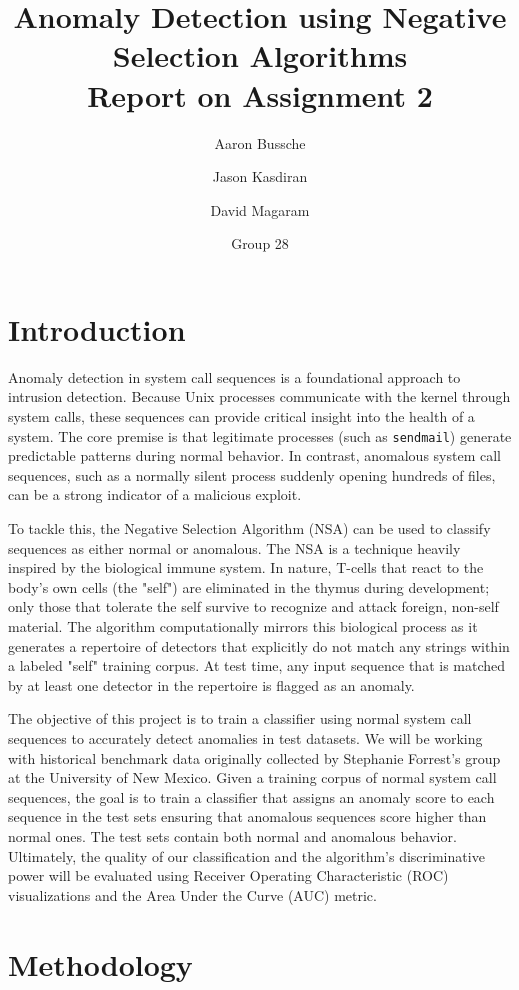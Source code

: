 \documentclass{article}
\title{Anomaly Detection using Negative Selection Algorithms\\[0.3em] \large Report on Assignment 2}
\author{Aaron Bussche \and Jason Kasdiran \and David Magaram}
\date{Group 28}
\begin{document}
\maketitle

\section{Introduction}
Anomaly detection in system call sequences is a foundational approach to intrusion detection. Because Unix processes communicate with the kernel through system calls, these sequences can provide critical insight into the health of a system. The core premise is that legitimate processes (such as \texttt{sendmail}) generate predictable patterns during normal behavior. In contrast, anomalous system call sequences, such as a normally silent process suddenly opening hundreds of files, can be a strong indicator of a malicious exploit.

To tackle this, the Negative Selection Algorithm (NSA) can be used to classify sequences as either normal or anomalous. The NSA is a technique heavily inspired by the biological immune system. In nature, T-cells that react to the body’s own cells (the "self") are eliminated in the thymus during development; only those that tolerate the self survive to recognize and attack foreign, non-self material. The algorithm computationally mirrors this biological process as it generates a repertoire of detectors that explicitly do not match any strings within a labeled "self" training corpus. At test time, any input sequence that is matched by at least one detector in the repertoire is flagged as an anomaly.

The objective of this project is to train a classifier using normal system call sequences to accurately detect anomalies in test datasets. We will be working with historical benchmark data originally collected by Stephanie Forrest's group at the University of New Mexico. Given a training corpus of normal system call sequences, the goal is to train a classifier that assigns an anomaly score to each sequence in the test sets ensuring that anomalous sequences score higher than normal ones. The test sets contain both normal and anomalous behavior. Ultimately, the quality of our classification and the algorithm's discriminative power will be evaluated using Receiver Operating Characteristic (ROC) visualizations 
and the Area Under the Curve (AUC) metric.

\section{Methodology}
\end{document}
